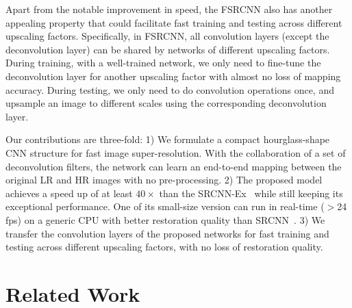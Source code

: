 \documentclass[runningheads]{llncs}
\begin{document}
Apart from the notable improvement in speed, the FSRCNN also has another appealing property that could facilitate fast training and testing across different upscaling factors. Specifically, in FSRCNN, all convolution layers (except the deconvolution layer) can be shared by networks of different upscaling factors. During training, with a well-trained network, we only need to fine-tune the deconvolution layer for another upscaling factor with almost no loss of mapping accuracy. During testing, we only need to do convolution operations once, and upsample an image to different scales using the corresponding deconvolution layer.

Our contributions are three-fold: 1) We formulate a compact hourglass-shape CNN structure for fast image super-resolution. With the collaboration of a set of deconvolution filters, the network can learn an end-to-end mapping between the original LR and HR images with no pre-processing.
2) The proposed model achieves a speed up of at least $40\times$ than the SRCNN-Ex~\cite{Dong2015} while still keeping its exceptional performance. One of its small-size version can run in real-time ($>$24 fps) on a generic CPU with better restoration quality than SRCNN~\cite{Dong2014}.
3) We transfer the convolution layers of the proposed networks for fast training and testing across different upscaling factors, with no loss of restoration quality.

\section{Related Work}
\end{document}
